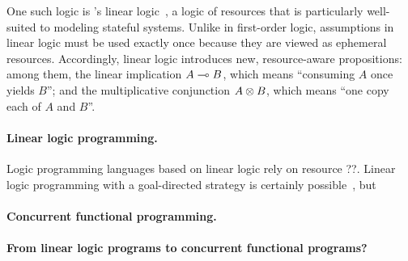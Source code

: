 One such logic is \citeauthor{Girard:TCS87}'s linear logic~\autocite*{Girard:TCS87}, a logic of resources that is particularly well-suited to modeling stateful systems.
Unlike in first-order logic, assumptions in linear logic must be used exactly once because they are viewed as ephemeral resources.
Accordingly, linear logic introduces new, resource-aware propositions: among them, the linear implication $A \multimap B$, which means \enquote{consuming $A$ once yields $B$}; and the multiplicative conjunction $A \otimes B$, which means \enquote{one copy each of $A$ and $B$}.

\paragraph*{Linear logic programming.}
Logic programming languages based on linear logic rely on resource {??}.
Linear logic programming with a goal-directed strategy is certainly possible~\autocite[for example]{Hodas+Miller:IC94}, but 

\paragraph*{Concurrent functional programming.}


\paragraph*{From linear logic programs to concurrent functional programs?}


\clearpage






